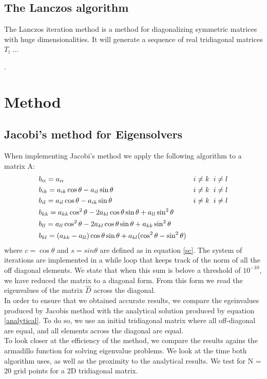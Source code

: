 \documentclass[%
reprint,
amsmath,amssymb,
aps,
]{revtex4-1}
\begin{document}
\subsection{The Lanczos algorithm}
The Lanczos iteration method is a method for diagonalizing symmetric matrices with huge dimensionalities. It will generate a sequence of real tridiagonal matrices $T_l$ ...

\newpage.
\newpage 

\section*{Method}
\subsection{Jacobi's method for Eigensolvers}
\noindent When implementing Jacobi's method we apply the following algorithm to a matrix A:
\begin{align*}
	&b_{ii} = a_{ii} \hspace{2mm}& i\not=k &\hspace{2mm} i\not=l\\
	&b_{ik} = a_{ik}\cos\theta -a_{il}\sin\theta \hspace{2mm}& i\not=k &\hspace{2mm} i\not=l \\
	&b_{il}  = a_{il}\cos\theta -a_{ik}\sin\theta \hspace{2mm}& i\not=k &\hspace{2mm} i\not=l\\
	&b_{kk} = a_{kk}\cos^2\theta -2a_{kl}\cos\theta\sin\theta +a_{ll}\sin^2\theta&&\\
	&b_{ll} = a_{ll}\cos^2\theta -2a_{kl}\cos\theta\sin\theta +a_{kk}\sin^2\theta&& \\
	&b_{kl} = (a_{kk}-a_{ll})\cos\theta\sin\theta+a_{kl}(\cos^2\theta -\sin^2\theta)\\
\end{align*}
where $c = \cos\theta$ and $s = sin\theta$ are defined as in equation \ref{sc}. The system of iterations are implemented in a while loop that keeps track of the norm of all the off diagonal elements. We state that when this sum is belove a threshold of $10^{-10}$, we have reduced the matrix to a diagonal form. From this form we read the eigenvalues of the matrix $\hat{D}$ across the diagonal. \\
In order to ensure that we obtained accurate results, we compare the egeinvalues produced by Jacobis method with the analytical solution produced by equation \ref{analytical}. To do so, we use an initial tridiagonal matrix where all off-diagonal are equal, and all elements across the diagonal are equal. \\
To look closer at the efficiency of the method, we compare the results agains the armadillo function for solving eigenvalue problems. We look at the time both algorithm uses, as well as the proximity to the analytical results. We test for N = 20 grid points for a 2D tridiagonal matrix.  
\end{document}
